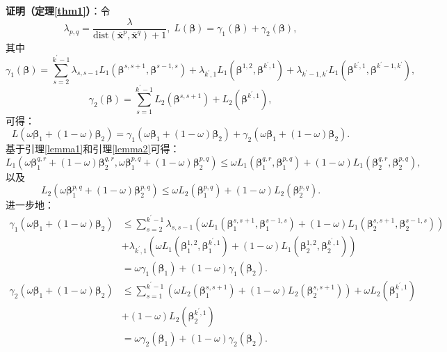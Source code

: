 \documentclass{NauThesis}
\begin{document}
\noindent \textbf{证明（定理\ref{thm1}）}：令$$\lambda_{p,q}=\dfrac{\lambda}{\text{dist}(\overline{\boldsymbol{x}}^{p},\overline{\boldsymbol{x}}^{q})+1},\;L(\boldsymbol{\beta})=\gamma_1(\boldsymbol{\beta})+\gamma_2(\boldsymbol{\beta}),$$
其中$$\gamma_1(\boldsymbol{\beta})=\sum\limits_{s=2}^{k^\prime-1}\lambda_{s,s-1}L_1(\boldsymbol{\beta}^{s,s+1},\boldsymbol{\beta}^{s-1,s}) +\lambda_{k^\prime,1}L_1(\boldsymbol{\beta}^{1,2},\boldsymbol{\beta}^{k^\prime,1})+\lambda_{k^\prime-1,k^\prime}L_1(\boldsymbol{\beta}^{k^\prime,1},
\boldsymbol{\beta}^{k^\prime-1,k^\prime}),$$
$$\gamma_2(\boldsymbol{\beta})=\sum\limits_{s=1}^{k^\prime-1}L_2(\boldsymbol{\beta}^{s,s+1})+L_2(\boldsymbol{\beta}^{k^\prime,1}),$$
可得：$$L(\omega\boldsymbol{\beta}_1+(1-\omega)\boldsymbol{\beta}_2)=\gamma_1(\omega\boldsymbol{\beta}_1+(1-\omega)\boldsymbol{\beta}_2)+\gamma_2(\omega\boldsymbol{\beta}_1+(1-\omega)\boldsymbol{\beta}_2).$$
基于引理\ref{lemma1}和引理\ref{lemma2}可得：
$$L_1(\omega\boldsymbol{\beta}^{q,r}_1+(1-\omega)\boldsymbol{\beta}^{q,r}_2,\omega\boldsymbol{\beta}^{p,q}_1+(1-\omega)\boldsymbol{\beta}^{p,q}_2)\le\omega L_1(\boldsymbol{\beta}^{q,r}_1,\boldsymbol{\beta}^{p,q}_1)+(1-\omega)L_1(\boldsymbol{\beta}_2^{q,r},\boldsymbol{\beta}^{p,q}_2),$$
以及$$L_2(\omega\boldsymbol{\beta}^{p,q}_1+(1-\omega)\boldsymbol{\beta}^{p,q}_2)\le\omega L_2(\boldsymbol{\beta}^{p,q}_1)+(1-\omega)L_2(\boldsymbol{\beta}^{p,q}_2).$$
进一步地：
$$\begin{aligned}
    \gamma_1(\omega\boldsymbol{\beta}_1+(1-\omega)\boldsymbol{\beta}_2)
    &\le \sum\limits_{s=2}^{k^\prime-1}\lambda_{s,s-1}(\omega L_1(\boldsymbol{\beta}^{s,s+1}_1,\boldsymbol{\beta}^{s-1,s}_1)+(1-\omega)L_1(\boldsymbol{\beta}_2^{s,s+1},\boldsymbol{\beta}^{s-1,s}_2))  \\ &+\lambda_{k^\prime,1}(\omega L_1(\boldsymbol{\beta}^{1,2}_1,\boldsymbol{\beta}^{k^\prime,1}_1)+(1-\omega)L_1(\boldsymbol{\beta}_2^{1,2},\boldsymbol{\beta}^{k^\prime,1}_2)) \\
    &=\omega\gamma_1(\boldsymbol{\beta}_1)+(1-\omega)\gamma_1(\boldsymbol{\beta}_2).
    \end{aligned}$$
$$\begin{aligned}
    \gamma_2(\omega\boldsymbol{\beta}_1+(1-\omega)\boldsymbol{\beta}_2)
    &\le\sum\limits_{s=1}^{k^\prime-1}(\omega L_2(\boldsymbol{\beta}^{s,s+1}_1)+(1-\omega)L_2(\boldsymbol{\beta}^{s,s+1}_2))+\omega L_2(\boldsymbol{\beta}^{k^\prime,1}_1)\\
    &+(1-\omega)L_2(\boldsymbol{\beta}^{k^\prime,1}_2) \\
    &=\omega\gamma_2(\boldsymbol{\beta}_1)+(1-\omega)\gamma_2(\boldsymbol{\beta}_2).
    \end{aligned}$$
\end{document}

